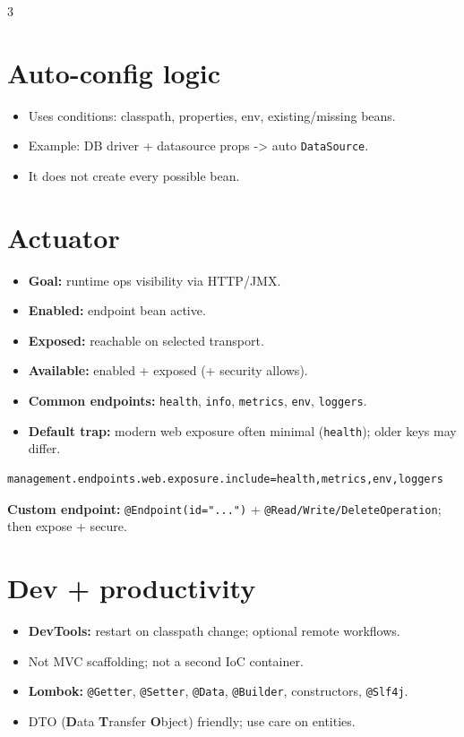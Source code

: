 \begin{multicols}{3}
\section*{Auto-config logic}
\begin{itemize}[leftmargin=*, nosep, topsep=0pt]
  \item Uses conditions: classpath, properties, env, existing/missing beans.
  \item Example: DB driver + datasource props -> auto \texttt{DataSource}.
  \item It does not create every possible bean.
\end{itemize}

\section*{Actuator}
\begin{itemize}[leftmargin=*, nosep, topsep=0pt]
  \item \textbf{Goal:} runtime ops visibility via HTTP/JMX.
  \item \textbf{Enabled:} endpoint bean active.
  \item \textbf{Exposed:} reachable on selected transport.
  \item \textbf{Available:} enabled + exposed (+ security allows).
  \item \textbf{Common endpoints:} \texttt{health}, \texttt{info}, \texttt{metrics}, \texttt{env}, \texttt{loggers}.
  \item \textbf{Default trap:} modern web exposure often minimal (\texttt{health}); older keys may differ.
\end{itemize}

\begin{lstlisting}[aboveskip=2pt,belowskip=2pt]
management.endpoints.web.exposure.include=health,metrics,env,loggers
\end{lstlisting}

\textbf{Custom endpoint:} \texttt{@Endpoint(id="...")} + \texttt{@Read/\allowbreak Write/\allowbreak DeleteOperation}; then expose + secure.



\section*{Dev + productivity}
\begin{itemize}[leftmargin=*, nosep, topsep=0pt]
  \item \textbf{DevTools:} restart on classpath change; optional remote workflows.
  \item Not MVC scaffolding; not a second IoC container.
  \item \textbf{Lombok:} \texttt{@Getter}, \texttt{@Setter}, \texttt{@Data}, \texttt{@Builder}, constructors, \texttt{@Slf4j}.
  \item DTO (\textbf{D}ata \textbf{T}ransfer \textbf{O}bject) friendly; use care on entities.
\end{itemize}


\end{multicols}
